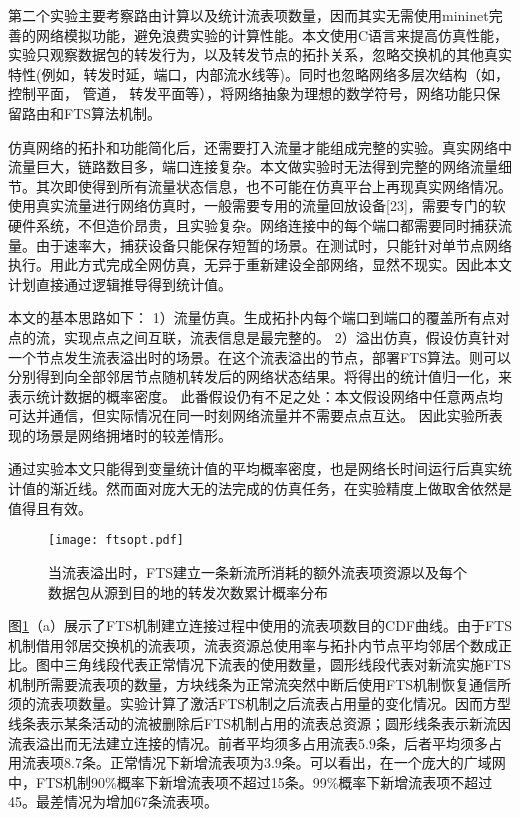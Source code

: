 第二个实验主要考察路由计算以及统计流表项数量，因而其实无需使用mininet完善的网络模拟功能，避免浪费实验的计算性能。本文使用C语言来提高仿真性能，实验只观察数据包的转发行为，以及转发节点的拓扑关系，忽略交换机的其他真实特性(例如，转发时延，端口，内部流水线等)。同时也忽略网络多层次结构（如，控制平面， 管道， 转发平面等），将网络抽象为理想的数学符号，网络功能只保留路由和FTS算法机制。

仿真网络的拓扑和功能简化后，还需要打入流量才能组成完整的实验。真实网络中流量巨大，链路数目多，端口连接复杂。本文做实验时无法得到完整的网络流量细节。其次即使得到所有流量状态信息，也不可能在仿真平台上再现真实网络情况。使用真实流量进行网络仿真时，一般需要专用的流量回放设备[23]，需要专门的软硬件系统，不但造价昂贵，且实验复杂。网络连接中的每个端口都需要同时捕获流量。由于速率大，捕获设备只能保存短暂的场景。在测试时，只能针对单节点网络执行。用此方式完成全网仿真，无异于重新建设全部网络，显然不现实。因此本文计划直接通过逻辑推导得到统计值。

本文的基本思路如下：
1）流量仿真。生成拓扑内每个端口到端口的覆盖所有点对点的流，实现点点之间互联，流表信息是最完整的。
2）溢出仿真，假设仿真针对一个节点发生流表溢出时的场景。在这个流表溢出的节点，部署FTS算法。则可以分别得到向全部邻居节点随机转发后的网络状态结果。将得出的统计值归一化，来表示统计数据的概率密度。
此番假设仍有不足之处：本文假设网络中任意两点均可达并通信，但实际情况在同一时刻网络流量并不需要点点互达。
因此实验所表现的场景是网络拥堵时的较差情形。

通过实验本文只能得到变量统计值的平均概率密度，也是网络长时间运行后真实统计值的渐近线。然而面对庞大无的法完成的仿真任务，在实验精度上做取舍依然是值得且有效。

\begin{figure}[!ht]
	\centering 
	\vspace{-1.5mm} 
	\texttt{[image: ftsopt.pdf]}
	\caption{当流表溢出时，FTS建立一条新流所消耗的额外流表项资源以及每个数据包从源到目的地的转发次数累计概率分布} \label{fig:ftsopt}
\end{figure}

图\ref{fig:ftsopt}（a）展示了FTS机制建立连接过程中使用的流表项数目的CDF曲线。由于FTS机制借用邻居交换机的流表项，流表资源总使用率与拓扑内节点平均邻居个数成正比。图中三角线段代表正常情况下流表的使用数量，圆形线段代表对新流实施FTS机制所需要流表项的数量，方块线条为正常流突然中断后使用FTS机制恢复通信所须的流表项数量。实验计算了激活FTS机制之后流表占用量的变化情况。因而方型线条表示某条活动的流被删除后FTS机制占用的流表总资源；圆形线条表示新流因流表溢出而无法建立连接的情况。前者平均须多占用流表5.9条，后者平均须多占用流表项8.7条。正常情况下新增流表项为3.9条。可以看出，在一个庞大的广域网中，FTS机制90\%概率下新增流表项不超过15条。99\%概率下新增流表项不超过45。最差情况为增加67条流表项。

